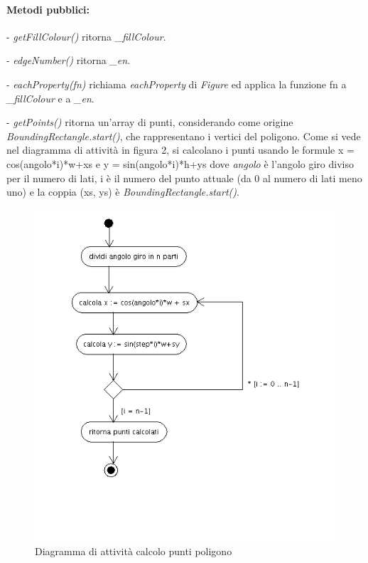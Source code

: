 \paragraph{Metodi pubblici:}
\begin{elencopuntato}[\subsubsecindent]
\item[-] \textit{getFillColour()} ritorna \textit{{\_}fillColour}.
\item[-] \textit{edgeNumber()} ritorna \textit{{\_}en}.
\item[-] \textit{eachProperty(fn)} richiama \textit{eachProperty} di \textit{Figure} ed applica la funzione fn a \textit{{\_}fillColour} e a \textit{{\_en}}.
\item[-] \textit{getPoints()} ritorna un'array di punti, considerando come origine \textit{BoundingRectangle.start()}, che rappresentano i vertici del poligono. Come si vede nel diagramma di attivit\`a in figura 2, si calcolano i punti usando le formule x = cos(angolo*i)*w+xs e y = sin(angolo*i)*h+ys dove \textit{angolo} \`e l'angolo giro diviso per il numero di lati, i \`e il numero del punto attuale (da 0 al numero di lati meno uno) e la coppia (xs, ys) \`e \textit{BoundingRectangle.start()}. 

\begin{figure}[!ht]
\centering
\includegraphics[scale=0.5]{polygonpoints.png}
\caption{Diagramma di attivit\`a calcolo punti poligono}
\end{figure}


\end{elencopuntato}
